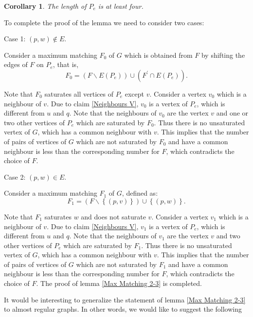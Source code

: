 \documentclass[fleqn,12pt,twoside]{article}
\newtheorem{corollary}{Corollary}
\newenvironment{proof}[1][Proof.]{\begin{trivlist}
\item[\hskip \labelsep {\bfseries #1}]}{\end{trivlist}}
\begin{document}
\begin{proof}
\begin{corollary}
The length of $P_{e}$ is at least four.
\end{corollary}

To complete the proof of the lemma we need to consider two cases:

Case 1: $(p,w)\notin E$.

Consider a maximum matching $F_{0}$ of $G$ which is obtained from
$F$ by
shifting the edges of $F$ on $P_{e}$, that is,\begin{equation*}
F_{0}=(F\backslash E(P_{e}))\cup (F^{\prime }\cap E(P_{e})).
\end{equation*}

Note that $F_{0}$ saturates all vertices of $P_{e}$ except $v$.
Consider a vertex $v_{0}$ which is a neighbour of $v$. Due to claim
\ref{Neighbours V}, $v_{0}$ is a vertex of $P_{e}$, which is
different from $u$ and $q$. Note that the neighbours of $v_{0}$ are
the vertex $v$ and one or two other vertices of $P_{e}$ which are
saturated by $F_{0}$. Thus there is no unsaturated vertex of $G$,
which has a common neighbour with $v$. This implies that the number
of pairs of vertices of $G$ which are not saturated by $F_{0}$ and
have a common neighbour is less than the corresponding number for
$F$, which contradicts the choice of $F$.

Case 2: $(p,w)\in E$.

Consider a maximum matching $F_{1}$ of $G$, defined as:\begin{equation*}
F_{1}=(F\backslash \left\{ (p,v)\right\} )\cup \left\{ (p,w)\right\}
.
\end{equation*}

Note that $F_{1}$ saturates $w$ and does not saturate $v$. Consider
a vertex $v_{1}$ which is a neighbour of $v$. Due to claim
\ref{Neighbours V}, $v_{1}$ is a vertex of $P_{e}$, which is
different from $u$ and $q$. Note that the neighbours of $v_{1}$ are
the vertex $v$ and two other vertices of $P_{e}$
which are saturated by $F_{1}$. Thus there is no unsaturated vertex of $G$, which has a common neighbour with $v$. This implies that the
number of pairs of vertices of $G$ which are not saturated by
$F_{1}$ and have a common neighbour is less than the corresponding
number for $F$, which contradicts the choice of $F$. The proof of
lemma \ref{Max Matching 2-3} is completed.
\end{proof}

It would be interesting to generalize the statement of lemma
\ref{Max Matching 2-3} to almost regular graphs. In other words, we
would like to suggest the following
\end{document}
